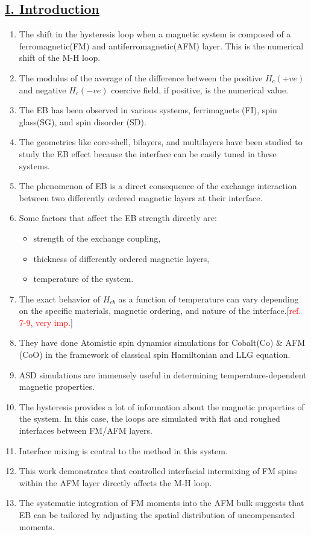 \subsection*{\underline{I. Introduction}}
\begin{enumerate}
    \item The shift in the hysteresis loop when a magnetic system is composed of a ferromagnetic(FM) and antiferromagnetic(AFM) layer. This is the numerical shift of the M-H loop.
    \item The modulus of the average of the difference between the positive $H_c(+ve)$ and negative $H_c(-ve)$ coercive field, if positive, is the numerical value.
    \item The EB has been observed in various systems, ferrimagnets (FI), spin glass(SG), and spin disorder (SD).
    \item The geometries like core-shell, bilayers, and multilayers have been studied to study the EB effect because the interface can be easily tuned in these systems.
    \item The phenomenon of EB is a direct consequence of the exchange interaction between two differently ordered magnetic layers at their interface.
    \item Some factors that affect the EB strength directly are:
    \begin{itemize}
        \item strength of the exchange coupling,
        \item thickness of differently ordered magnetic layers,
        \item temperature of the system.
    \end{itemize}
    \item The exact behavior of $H_{eb}$ as a function of temperature can vary depending on the specific materials, magnetic ordering, and nature of the interface.[\textcolor{red}{ref. 7-9, very imp.}]
    \item They have done Atomistic spin dynamics simulations for Cobalt(Co) \& AFM (CoO) in the framework of classical spin Hamiltonian and LLG equation.
    \item ASD simulations are immensely useful in determining temperature-dependent magnetic properties.
    \item The hysteresis provides a lot of information about the magnetic properties of the system. In this case, the loops are simulated with flat and roughed interfaces between FM/AFM layers.
    \item Interface mixing is central to the method in this system.
    \item This work demonstrates that controlled interfacial intermixing of FM spins within the AFM layer directly affects the M-H loop.
    \item The systematic integration of FM moments into the AFM bulk suggests that EB can be tailored by adjusting the spatial distribution of uncompensated moments.
\end{enumerate}


